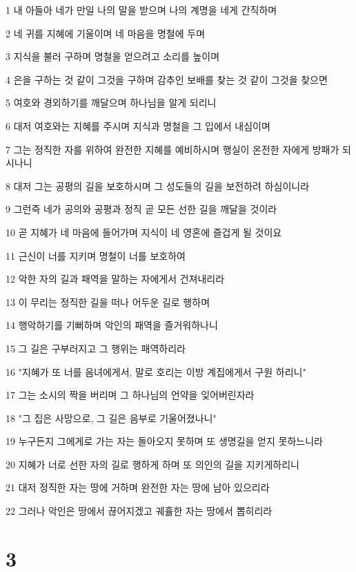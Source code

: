 \par 1 내 아들아 네가 만일 나의 말을 받으며 나의 계명을 네게 간직하며
\par 2 네 귀를 지혜에 기울이며 네 마음을 명철에 두며
\par 3 지식을 불러 구하며 명철을 얻으려고 소리를 높이며
\par 4 은을 구하는 것 같이 그것을 구하며 감추인 보배를 찾는 것 같이 그것을 찾으면
\par 5 여호와 경외하기를 깨달으며 하나님을 알게 되리니
\par 6 대저 여호와는 지혜를 주시며 지식과 명철을 그 입에서 내심이며
\par 7 그는 정직한 자를 위하여 완전한 지혜를 예비하시며 행실이 온전한 자에게 방패가 되시나니
\par 8 대저 그는 공평의 길을 보호하시며 그 성도들의 길을 보전하려 하심이니라
\par 9 그런즉 네가 공의와 공평과 정직 곧 모든 선한 길을 깨달을 것이라
\par 10 곧 지혜가 네 마음에 들어가며 지식이 네 영혼에 즐겁게 될 것이요
\par 11 근신이 너를 지키며 명철이 너를 보호하여
\par 12 악한 자의 길과 패역을 말하는 자에게서 건져내리라
\par 13 이 무리는 정직한 길을 떠나 어두운 길로 행하며
\par 14 행악하기를 기뻐하며 악인의 패역을 즐거워하나니
\par 15 그 길은 구부러지고 그 행위는 패역하리라
\par 16 "지혜가 또 너를 음녀에게서, 말로 호리는 이방 계집에게서 구원 하리니"
\par 17 그는 소시의 짝을 버리며 그 하나님의 언약을 잊어버린자라
\par 18 "그 집은 사망으로, 그 길은 음부로 기울어졌나니"
\par 19 누구든지 그에게로 가는 자는 돌아오지 못하며 또 생명길을 얻지 못하느니라
\par 20 지혜가 너로 선한 자의 길로 행하게 하며 또 의인의 길을 지키게하리니
\par 21 대저 정직한 자는 땅에 거하며 완전한 자는 땅에 남아 있으리라
\par 22 그러나 악인은 땅에서 끊어지겠고 궤휼한 자는 땅에서 뽑히리라

\chapter{3}

